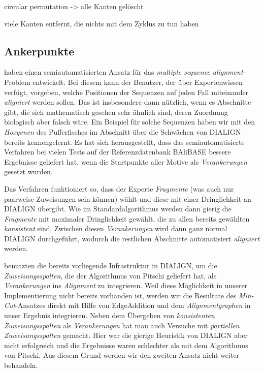 circular permutation -> alle Kanten gelöscht

viele Kanten entfernt, die nichts mit dem Zyklus zu tun haben

\subsection{Ankerpunkte}

\cite{mpps06} haben einen semiautomatisierten Ansatz für das \emph{multiple sequence alignment}-Problem entwickelt. Bei diesem kann der Benutzer, der über Expertenwissen verfügt, vorgeben, welche Positionen der Sequenzen auf jeden Fall miteinander \emph{aligniert} werden sollen. Das ist insbesondere dann nützlich, wenn es Abschnitte gibt, die sich mathematisch gesehen sehr ähnlich sind, deren Zuordnung biologisch aber falsch wäre. Ein Beispiel für solche Sequenzen haben wir mit den \emph{Hoxgenen} des Pufferfisches im Abschnitt über die Schwächen von DIALIGN bereits kennengelernt. Es hat sich herausgestellt, dass das semiautomatisierte Verfahren bei vielen Tests auf der Referenzdatenbank BAliBASE bessere Ergebnisse geliefert hat, wenn die Startpunkte aller Motive als \emph{Verankerungen} gesetzt wurden.

Das Verfahren funktioniert so, dass der Experte \emph{Fragmente} (was auch nur paarweise Zuweisungen sein können) wählt und diese mit einer Dringlichkeit an DIALIGN übergibt. Wie im Standardalgorithmus werden dann gierig die \emph{Fragmente} mit maximaler Dringlichkeit gewählt, die zu allen bereits gewählten \emph{konsistent} sind. Zwischen diesen \emph{Verankerungen} wird dann ganz normal DIALIGN durchgeführt, wodurch die restlichen Abschnitte automatisiert \emph{aligniert} werden.

\cite{cpm10} benutzten die bereits vorliegende Infrastruktur in DIALIGN, um die \emph{Zuweisungsspalten}, die der Algorithmus von Pitschi geliefert hat, als \emph{Verankerungen} ins \emph{Alignment} zu integrieren. Weil diese Möglichkeit in unserer Implementierung nicht bereits vorhanden ist, werden wir die Resultate des \emph{Min-Cut}-Ansatzes direkt mit Hilfe von \textrm{EdgeAddition} und dem \emph{Alignmentgraphen} in unser Ergebnis integrieren. Neben dem Übergeben von \emph{konsistenten Zuweisungsspalten} als \emph{Verankerungen} hat man auch Versuche mit \emph{partiellen Zuweisungsspalten} gemacht. Hier war die gierige Heuristik von DIALIGN aber nicht erfolgreich und die Ergebnisse waren schlechter als mit dem Algorithmus von Pitschi. Aus diesem Grund werden wir den zweiten Ansatz nicht weiter behandeln.

